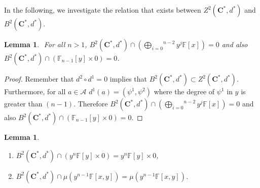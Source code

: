 \documentclass[a4paper, 12pt,oneside,reqno]{amsart}
\newtheorem{lemma}[theorem]{Lemma}
\theoremstyle{definition}
\begin{document}
In the following, we investigate the relation  that exists between $Z^{2}(\textbf{C}^{*},d^{*})$ and $B^{2}(\textbf{C}^{*},d^{*})$. 
\begin{lemma}  $\label{L5}$
For all $n>1$,
              $B^{2}(\textbf{C}^{*},d^{*})\cap (\overset{n-2}{\underset{i=0}{\bigoplus}}y^{j} \mathbb{F}[x]) = 0$ and also $B^{2}(\textbf{C}^{*},d^{*})\cap (\mathbb{F}_{n-1}[y]\times 0) = 0$.
             \end{lemma}
\begin{proof}
Remember that $d^{2}\circ d^{1}=0$ implies that $B^{2}(\textbf{C}^{*},d^{*})\subset Z^{2}(\textbf{C}^{*},d^{*})$.
Furthermore, for all $a\in \mathcal{A}$ $d^{1}(a) = (\psi^{1},\psi^{2})$ where 
 the degree of $\psi^{1}$ in $y$ is greater  than $(n-1)$. Therefore   $B^{2}(\textbf{C}^{*},d^{*})\cap (\overset{n-2}{\underset{i=0}{\bigoplus}}y^{j} \mathbb{F}[x]) = 0$ and also $B^{2}(\textbf{C}^{*},d^{*})\cap (\mathbb{F}_{n-1}[y]\times 0) = 0$.
\end{proof}    
            \begin{lemma}$\label{L6}$         
\begin{enumerate}
\item[1.] $B^{2}(\textbf{C}^{*},d^{*}) \cap( y^{n} \mathbb{F}[y]\times 0 )= y^{n} \mathbb{F}[y]\times 0$,
\item[2.] $B^{2}(\textbf{C}^{*},d^{*})\cap \mu\left(y^{n-1} \mathbb{F}[x,y]\right)  =  \mu\left(y^{n-1} \mathbb{F}[x,y]\right)$.
\end{enumerate}
            \end{lemma}
\end{document}
